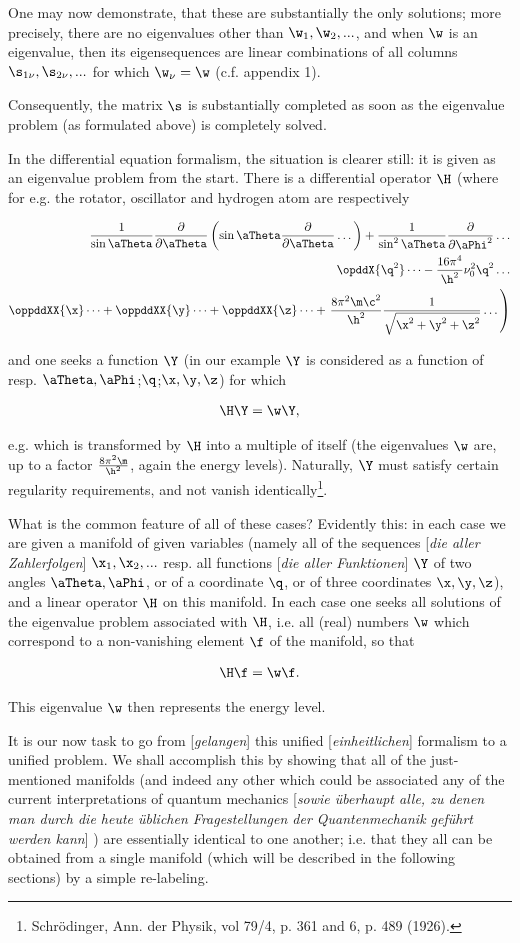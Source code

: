 \documentclass{article}
\newcommand{\WTF}[1]{
[\it{\small{#1}}]
}
\newcommand{\uequ}[1]{
\begin{align*}
#1
\end{align*}
}
\newcommand{\var}[1]{#1}
\newcommand{\inv}[1]{\frac{1}{#1}}
\newcommand{\oppddX}[1]{
\frac{\partial}{\partial{#1}}
}
\renewcommand{\it}[1]{\textit{#1}}
\begin{document}
One may now demonstrate, that these are substantially the only solutions; more precisely, there are no eigenvalues other than $\w_1,\w_2,...$, and when $\w$ is an eigenvalue, then its eigensequences are linear combinations of all columns $\s_{1\nu},\s_{2\nu},...$ for which $\w_\nu=\w$ (c.f. appendix 1).

Consequently, the matrix $\s$ is substantially completed as soon as the eigenvalue problem (as formulated above) is completely solved.

In the differential equation formalism, the situation is clearer still: it is given as an eigenvalue problem from the start. There is a differential operator $\H$ (where for e.g. the rotator, oscillator and hydrogen atom are respectively
\uequ{
\inv{\sin\aTheta}\oppddX{\aTheta}\left(
\sin\aTheta\oppddX{\aTheta}\dots\right)
+ \inv{\sin^2\aTheta}\oppddX{\aPhi^2}\dots\\
\opddX{\q^2}\dots - \frac{16\pi^4}{\h^2}\var{\nu}^2_0\q^2\dots\\
\oppddXX{\x}\dots+\oppddXX{\y}\dots+\oppddXX{\z}\dots+
\left.\frac{8\pi^2\m\c^2}{\h^2}\inv{\sqrt{\x^2+\y^2+\z^2}}\dots\right)
}
and one seeks a function $\Y$ (in our example $\Y$ is considered as a function of resp. $\aTheta,\aPhi$;$\q$;$\x,\y,\z$) for which
\uequ{
\H\Y=\w\Y,
}
e.g. which is transformed by $\H$ into a multiple of itself (the eigenvalues $\w$ are, up to a factor $\frac{8\pi^2\m}{\h^2}$, again the energy levels). Naturally, $\Y$ must satisfy certain regularity requirements, and not vanish identically\footnote{Schrödinger, Ann. der Physik, vol 79/4, p. 361 and 6, p. 489 (1926).}.

What is the common feature of all of these cases? Evidently this: in each case we are given a manifold of given variables (namely all of the sequences\WTF{die aller Zahlerfolgen} $\x_1,\x_2,...$ resp. all functions\WTF{die aller Funktionen} $\Y$ of two angles $\aTheta,\aPhi$, or of a coordinate $\q$, or of three coordinates $\x,\y,\z$), and a linear operator $\H$ on this manifold. In each case one seeks all solutions of the eigenvalue problem associated with $\H$, i.e. all (real) numbers $\w$ which correspond to a non-vanishing element $\f$ of the manifold, so that
\uequ{
\H\f=\w\f.
}
This eigenvalue $\w$ then represents the energy level.

It is our now task to go from\WTF{gelangen} this unified\WTF{einheitlichen} formalism to a unified problem. We shall accomplish this by showing that all of the just-mentioned manifolds (and indeed any other which could be associated any of the current interpretations of quantum mechanics\WTF{sowie überhaupt alle, zu denen man durch die heute üblichen Fragestellungen der Quantenmechanik geführt werden kann}) are essentially identical to one another; i.e. that they all can be obtained from a single manifold (which will be described in the following sections) by a simple re-labeling.
\end{document}
